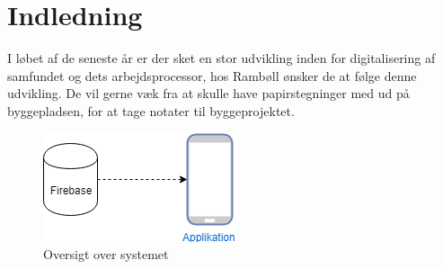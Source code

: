 \chapter{Indledning}

I løbet af de seneste år er der sket en stor udvikling inden for digitalisering af samfundet og dets arbejdsprocessor, hos Rambøll ønsker de at følge denne udvikling. De vil gerne væk fra at skulle have papirstegninger med ud på byggepladsen, for at tage notater til byggeprojektet.

\begin{figure}[H]
	\centering
	\includegraphics[width=0.4\linewidth]{Indledning/Oversigtoversystem}
	\caption{Oversigt over systemet}
	\label{fig:OversigtSystembeskrivelse}
\end{figure}

